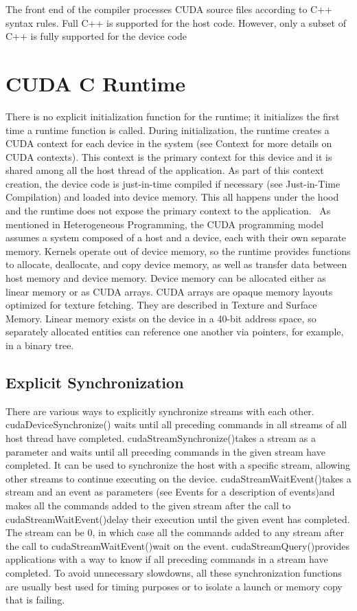 \documentclass[openany]{book}
\begin{document}
The front end of the compiler processes CUDA source files according to C++ syntax rules. Full C++ is supported for the host code. However, only a subset of C++ is fully supported for the device code~\cite[p.~3.1.5]{CUDA18}



\section{CUDA C Runtime}%
There is no explicit initialization function for the runtime; it initializes the first time a runtime function is called. During initialization, the runtime creates a CUDA context for each device in the system (see Context for more details on CUDA contexts). This context is the primary context for this device and it is shared among all the host thread of the application. As part of this context creation, the device code is just-in-time compiled if necessary (see Just-in-Time Compilation) and loaded into device memory. This all happens under the hood and the runtime does not expose the primary context to the application.~\cite[p.~3.2.1]{CUDA18}
As mentioned in Heterogeneous Programming, the CUDA programming model assumes a system composed of a host and a device, each with their own separate memory. Kernels operate out of device memory, so the runtime provides functions to allocate, deallocate, and copy device memory, as well as transfer data between host memory and device memory. Device memory can be allocated either as linear memory or as CUDA arrays. CUDA arrays are opaque memory layouts optimized for texture fetching. They are described in Texture and Surface Memory. Linear memory exists on the device in a 40-bit address space, so separately allocated entities can reference one another via pointers, for example, in a binary tree.~\cite[p.~3.2.2]{CUDA18}

\subsection{Explicit Synchronization}%
There are various ways to explicitly synchronize streams with each other.
cudaDeviceSynchronize() waits until all preceding commands in all streams of all host thread have completed.
cudaStreamSynchronize()takes a stream as a parameter and waits until all preceding commands in the given stream have completed. It can be used to synchronize the host with a specific stream, allowing other streams to continue executing on the device.
cudaStreamWaitEvent()takes a stream and an event as parameters (see Events for a description of events)and makes all the commands added to the given stream after the call to cudaStreamWaitEvent()delay their execution until the given event has completed. The stream can be 0, in which case all the commands added to any stream after the call to cudaStreamWaitEvent()wait on the event.
cudaStreamQuery()provides applications with a way to know if all preceding commands in a stream have completed. 
To avoid unnecessary slowdowns, all these synchronization functions are usually best used for timing purposes or to isolate a launch or memory copy that is failing.
\end{document}
